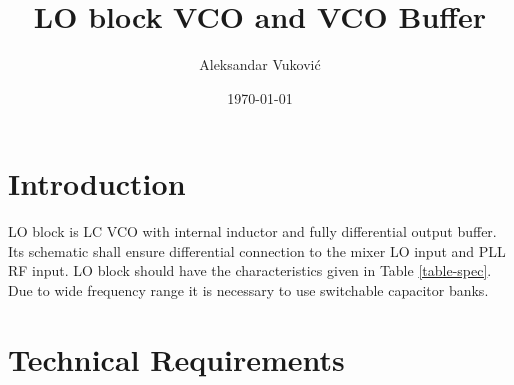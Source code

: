 \documentclass{article}
\title{LO block VCO and VCO Buffer} %
\author{Aleksandar Vuković} %
\date{\today} %
\begin{document}
\maketitle %


\section*{Introduction} %

LO block is LC VCO with internal inductor and fully differential output buffer. Its schematic shall ensure differential connection to the mixer LO input and PLL RF input. LO block should have the characteristics given in Table \ref{table-spec}. Due to wide frequency range it is necessary to use switchable capacitor banks.  

\section{Technical Requirements}
\end{document}
